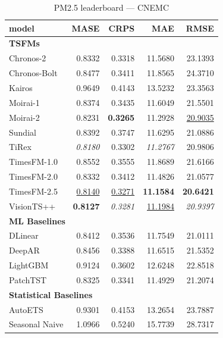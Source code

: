 \begin{table}[H]
\caption{PM2.5 leaderboard --- CNEMC}
\centering
\begin{small}
\begin{tabular}{lrrrr}
\toprule
model & MASE & CRPS & MAE & RMSE \\
\midrule
\multicolumn{5}{l}{\textbf{TSFMs}} \\
Chronos-2 & 0.8332 & 0.3318 & 11.5680 & 23.1393 \\
Chronos-Bolt & 0.8477 & 0.3411 & 11.8565 & 24.3710 \\
Kairos & 0.9649 & 0.4143 & 13.5232 & 23.3563 \\
Moirai-1 & 0.8374 & 0.3435 & 11.6049 & 21.5501 \\
Moirai-2 & 0.8231 & \textbf{0.3265} & 11.2928 & \underline{20.9035} \\
Sundial & 0.8392 & 0.3747 & 11.6295 & 21.0886 \\
TiRex & \textit{0.8180} & 0.3302 & \textit{11.2767} & 20.9806 \\
TimesFM-1.0 & 0.8552 & 0.3555 & 11.8689 & 21.6166 \\
TimesFM-2.0 & 0.8332 & 0.3412 & 11.4826 & 21.0577 \\
TimesFM-2.5 & \underline{0.8140} & \underline{0.3271} & \textbf{11.1584} & \textbf{20.6421} \\
VisionTS++ & \textbf{0.8127} & \textit{0.3281} & \underline{11.1984} & \textit{20.9397} \\
\midrule
\multicolumn{5}{l}{\textbf{ML Baselines}} \\
DLinear & 0.8412 & 0.3536 & 11.7549 & 21.0111 \\
DeepAR & 0.8456 & 0.3388 & 11.6515 & 21.5352 \\
LightGBM & 0.9124 & 0.3602 & 12.6248 & 22.8518 \\
PatchTST & 0.8325 & 0.3341 & 11.4929 & 21.2074 \\
\midrule
\multicolumn{5}{l}{\textbf{Statistical Baselines}} \\
AutoETS & 0.9301 & 0.4153 & 13.2654 & 23.7887 \\
Seasonal Naive & 1.0966 & 0.5240 & 15.7739 & 28.7317 \\
\bottomrule
\end{tabular}
\end{small}
\end{table}